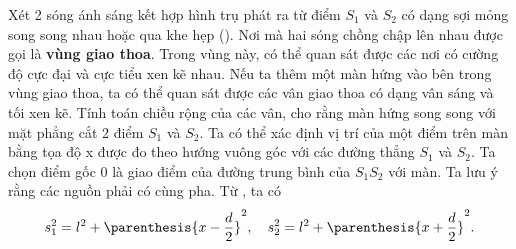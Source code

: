 Xét 2 sóng ánh sáng kết hợp hình trụ phát ra từ điểm $S_1$ và $S_2$ có dạng sợi mỏng song song nhau hoặc qua khe hẹp ().
Nơi mà hai sóng chồng chập lên nhau được gọi là \textbf{vùng giao thoa}.
Trong vùng này, có thể quan sát được các nơi có cường độ cực đại và cực tiểu xen kẽ nhau.
Nếu ta thêm một màn hứng vào bên trong vùng giao thoa, ta có thể quan sát được các vân giao thoa có dạng vân sáng và tối xen kẽ.
Tính toán chiều rộng của các vân, cho rằng màn hứng song song với mặt phẳng cắt 2 điểm $S_1$ và $S_2$.
Ta có thể xác định vị trí của một điểm trên màn bằng tọa độ x được đo theo hướng vuông góc với các đường thẳng $S_1$ và $S_2$.
Ta chọn điểm gốc $0$ là giao điểm của đường trung bình của $S_1S_2$ với màn.
Ta lưu ý rằng các nguồn phải có cùng pha.
Từ , ta có
\begin{equation*}
    s_1^2 = l^2 + \parenthesis{x - \frac{d}{2}}^2,\quad s_2^2 = l^2 + \parenthesis{x + \frac{d}{2}}^2.
\end{equation*}

